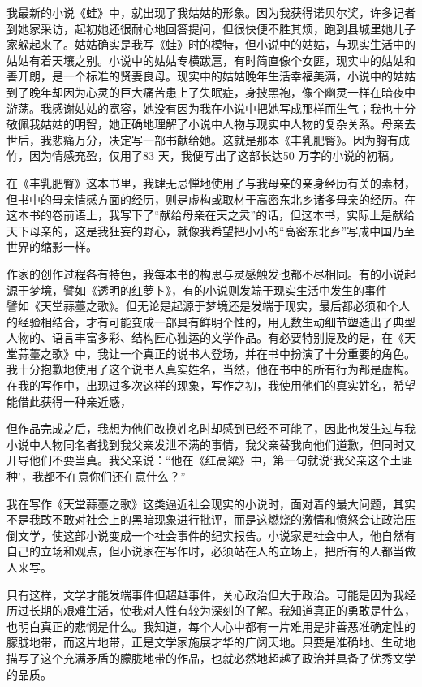 \documentclass[12pt,a5paper]{ctexbook}
\begin{document}
我最新的小说《蛙》中，就出现了我姑姑的形象。因为我获得诺贝尔奖，许多记者到她家采访，起初她还很耐心地回答提问，但很快便不胜其烦，跑到县城里她儿子家躲起来了。姑姑确实是我写《蛙》时的模特，但小说中的姑姑，与现实生活中的姑姑有着天壤之别。小说中的姑姑专横跋扈，有时简直像个女匪，现实中的姑姑和善开朗，是一个标准的贤妻良母。现实中的姑姑晚年生活幸福美满，小说中的姑姑到了晚年却因为心灵的巨大痛苦患上了失眠症，身披黑袍，像个幽灵一样在暗夜中游荡。我感谢姑姑的宽容，她没有因为我在小说中把她写成那样而生气；我也十分敬佩我姑姑的明智，她正确地理解了小说中人物与现实中人物的复杂关系。母亲去世后，我悲痛万分，决定写一部书献给她。这就是那本《丰乳肥臀》。因为胸有成竹，因为情感充盈，仅用了83 天，我便写出了这部长达50 万字的小说的初稿。

在《丰乳肥臀》这本书里，我肆无忌惮地使用了与我母亲的亲身经历有关的素材，但书中的母亲情感方面的经历，则是虚构或取材于高密东北乡诸多母亲的经历。在这本书的卷前语上，我写下了“献给母亲在天之灵”的话，但这本书，实际上是献给天下母亲的，这是我狂妄的野心，就像我希望把小小的“高密东北乡”写成中国乃至世界的缩影一样。

作家的创作过程各有特色，我每本书的构思与灵感触发也都不尽相同。有的小说起源于梦境，譬如《透明的红萝卜》，有的小说则发端于现实生活中发生的事件——譬如《天堂蒜薹之歌》。但无论是起源于梦境还是发端于现实，最后都必须和个人的经验相结合，才有可能变成一部具有鲜明个性的，用无数生动细节塑造出了典型人物的、语言丰富多彩、结构匠心独运的文学作品。有必要特别提及的是，在《天堂蒜薹之歌》中，我让一个真正的说书人登场，并在书中扮演了十分重要的角色。我十分抱歉地使用了这个说书人真实姓名，当然，他在书中的所有行为都是虚构。在我的写作中，出现过多次这样的现象，写作之初，我使用他们的真实姓名，希望能借此获得一种亲近感，

但作品完成之后，我想为他们改换姓名时却感到已经不可能了，因此也发生过与我小说中人物同名者找到我父亲发泄不满的事情，我父亲替我向他们道歉，但同时又开导他们不要当真。我父亲说：“他在《红高粱》中，第一句就说‘我父亲这个土匪种’，我都不在意你们还在意什么？”

我在写作《天堂蒜薹之歌》这类逼近社会现实的小说时，面对着的最大问题，其实不是我敢不敢对社会上的黑暗现象进行批评，而是这燃烧的激情和愤怒会让政治压倒文学，使这部小说变成一个社会事件的纪实报告。小说家是社会中人，他自然有自己的立场和观点，但小说家在写作时，必须站在人的立场上，把所有的人都当做人来写。

只有这样，文学才能发端事件但超越事件，关心政治但大于政治。可能是因为我经历过长期的艰难生活，使我对人性有较为深刻的了解。我知道真正的勇敢是什么，也明白真正的悲悯是什么。我知道，每个人心中都有一片难用是非善恶准确定性的朦胧地带，而这片地带，正是文学家施展才华的广阔天地。只要是准确地、生动地描写了这个充满矛盾的朦胧地带的作品，也就必然地超越了政治并具备了优秀文学的品质。
\end{document}
